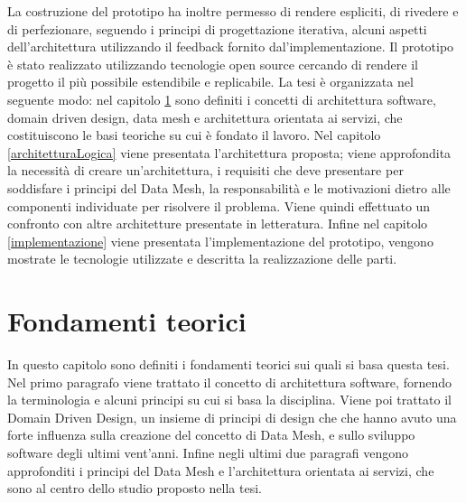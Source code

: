 \documentclass[12pt]{report}
\begin{document}
La costruzione del prototipo ha inoltre permesso di rendere espliciti, di rivedere e di perfezionare, seguendo i principi di progettazione iterativa, alcuni aspetti dell'architettura utilizzando il feedback fornito dal'implementazione.
Il prototipo è stato realizzato utilizzando tecnologie open source cercando di rendere il progetto il più possibile estendibile e replicabile.
La tesi è organizzata nel seguente modo: nel capitolo \ref{fondamenti teorici} sono definiti i concetti di architettura software, domain driven design, data mesh e architettura orientata ai servizi, che costituiscono le basi teoriche su cui è fondato il lavoro.
Nel capitolo \ref{architetturaLogica} viene presentata l'architettura proposta; viene approfondita la necessità di creare un'architettura, i requisiti che deve presentare per soddisfare i principi del Data Mesh, la responsabilità e le motivazioni dietro alle componenti individuate per risolvere il problema.
Viene quindi effettuato un confronto con altre architetture presentate in letteratura.
Infine nel capitolo \ref{implementazione} viene presentata l'implementazione del prototipo, vengono mostrate le tecnologie utilizzate e descritta la realizzazione delle parti.

\chapter{Fondamenti teorici}\label{fondamenti teorici}
In questo capitolo sono definiti i fondamenti teorici sui quali si basa questa tesi.
Nel primo paragrafo viene trattato il concetto di architettura software, fornendo la terminologia e alcuni principi su cui si basa la disciplina.
Viene poi trattato il Domain Driven Design, un insieme di principi di design che che hanno avuto una forte influenza sulla creazione del concetto di Data Mesh, e sullo sviluppo software degli ultimi vent'anni.
Infine negli ultimi due paragrafi vengono approfonditi i principi del Data Mesh e l'architettura orientata ai servizi, che sono al centro dello studio proposto nella tesi.
\end{document}
